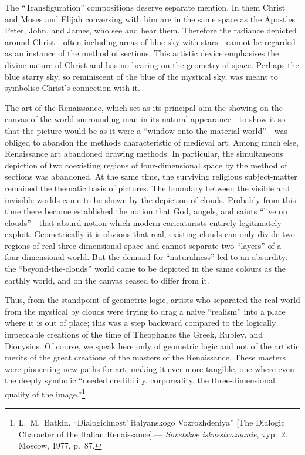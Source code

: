 
The ``Transfiguration'' compositions deserve separate mention.  In them Christ and Moses
and Elijah conversing with him are in the same space as the Apostles Peter, John, and
James, who see and hear them.  Therefore the radiance depicted around Christ---often
including areas of blue sky with stars---cannot be regarded as an instance of the method
of sections.  This artistic device emphasises the divine nature of Christ and has no
bearing on the geometry of space.  Perhaps the blue starry sky, so reminiscent of the
blue of the mystical sky, was meant to symbolise Christ's connection with it.

The art of the Renaissance, which set as its principal aim the showing on the canvas of
the world surrounding man in its natural appearance---to show it so that the picture would
be as it were a ``window onto the material world''---was obliged to abandon the methods
characteristic of medieval art.  Among much else, Renaissance art abandoned drawing
methods.  In particular, the simultaneous depiction of two coexisting regions of
four-dimensional space by the method of sections was abandoned.  At the same time, the
surviving religious subject-matter remained the thematic basis of pictures.  The boundary
between the visible and invisible worlds came to be shown by the depiction of clouds.
Probably from this time there became established the notion that God, angels, and saints
``live on clouds''---that absurd notion which modern caricaturists entirely legitimately
exploit.  Geometrically it is obvious that real, existing clouds can only divide two
regions of real three-dimensional space and cannot separate two ``layers'' of a
four-dimensional world.  But the demand for ``naturalness'' led to an absurdity: the
``beyond-the-clouds'' world came to be depicted in the same colours as the earthly world,
and on the canvas ceased to differ from it.


Thus, from the standpoint of geometric logic, artists who separated the real world from
the mystical by clouds were trying to drag a naive ``realism'' into a place where it is
out of place; this was a step backward compared to the logically impeccable creations of
the time of Theophanes the Greek, Rublev, and Dionysius.  Of course, we speak here only
of geometric logic and not of the artistic merits of the great creations of the masters
of the Renaissance.  These masters were pioneering new paths for art, making it ever more
tangible, one where even the deeply symbolic ``needed credibility, corporeality, the
three-dimensional quality of the image.''\footnote{L.~M.~Batkin.  ``Dialogichnost'
  italyanskogo Vozrozhdeniya'' [The Dialogic Character of the Italian Renaissance].---
  \emph{Sovetskoe iskusstvoznanie}, vyp.~2.  Moscow, 1977, p.~87.}

